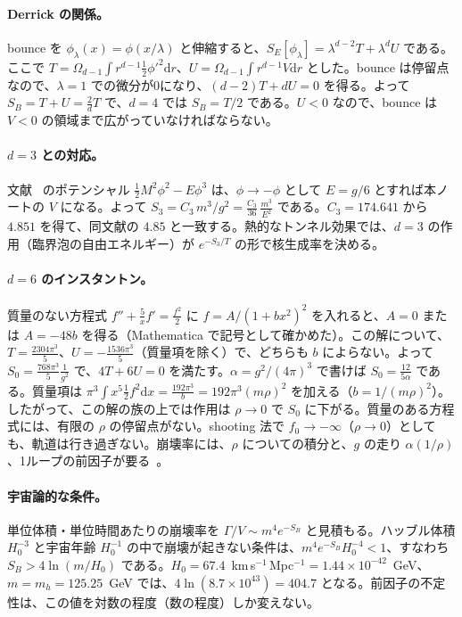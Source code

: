 \documentclass[a4paper,10pt]{ltjsarticle}
\newcommand{\dd}{\mathrm{d}}
\begin{document}
\paragraph{Derrick の関係。}bounce を $\phi_\lambda(x)=\phi(x/\lambda)$ と伸縮すると、$S_E[\phi_\lambda]=\lambda^{d-2}T+\lambda^dU$ である。ここで $T=\Omega_{d-1}\int r^{d-1}\frac12\phi'^2\dd r$、$U=\Omega_{d-1}\int r^{d-1}V\dd r$ とした。bounce は停留点なので、$\lambda=1$ での微分が0になり、$(d-2)T+dU=0$ を得る。よって $S_B=T+U=\frac2dT$ で、$d=4$ では $S_B=T/2$ である。$U<0$ なので、bounce は $V<0$ の領域まで広がっていなければならない。

\paragraph{$d=3$ との対応。}文献~\cite{dine92} のポテンシャル $\frac12M^2\phi^2-E\phi^3$ は、$\phi\to-\phi$ として $E=g/6$ とすれば本ノートの $V$ になる。よって $S_3=C_3\,m^3/g^2=\frac{C_3}{36}\,\frac{m^3}{E^2}$ である。$C_3=174.641$ から $4.851$ を得て、同文献の $4.85$ と一致する。熱的なトンネル効果では、$d=3$ の作用（臨界泡の自由エネルギー）が $e^{-S_3/T}$ の形で核生成率を決める。

\paragraph{$d=6$ のインスタントン。}質量のない方程式 $f''+\frac5xf'=\frac{f^2}{2}$ に $f=A/(1+bx^2)^2$ を入れると、$A=0$ または $A=-48b$ を得る（Mathematica で記号として確かめた）。この解について、$T=\frac{2304\pi^3}{5}$、$U=-\frac{1536\pi^3}{5}$（質量項を除く）で、どちらも $b$ によらない。よって $S_0=\frac{768\pi^3}{5}\frac1{g^2}$ で、$4T+6U=0$ を満たす。$\alpha=g^2/(4\pi)^3$ で書けば $S_0=\frac{12}{5\alpha}$ である。質量項は $\pi^3\int x^5\frac12f^2\dd x=\frac{192\pi^3}{b}=192\pi^3(m\rho)^2$ を加える（$b=1/(m\rho)^2$）。したがって、この解の族の上では作用は $\rho\to0$ で $S_0$ に下がる。質量のある方程式には、有限の $\rho$ の停留点がない。shooting 法で $f_0\to-\infty$（$\rho\to0$）としても、軌道は行き過ぎない。崩壊率には、$\rho$ についての積分と、$g$ の走り $\alpha(1/\rho)$、1ループの前因子が要る~\cite{affleck}。

\paragraph{宇宙論的な条件。}単位体積・単位時間あたりの崩壊率を $\Gamma/V\sim m^4e^{-S_B}$ と見積もる。ハッブル体積 $H_0^{-3}$ と宇宙年齢 $H_0^{-1}$ の中で崩壊が起きない条件は、$m^4e^{-S_B}H_0^{-4}<1$、すなわち $S_B>4\ln(m/H_0)$ である。$H_0=67.4$~km\,s$^{-1}$\,Mpc$^{-1}=1.44\times10^{-42}$~GeV、$m=m_h=125.25$~GeV では、$4\ln(8.7\times10^{43})=404.7$ となる。前因子の不定性は、この値を対数の程度（数の程度）しか変えない。
\end{document}
